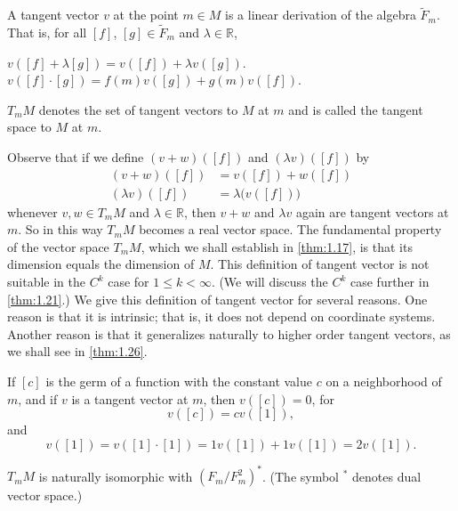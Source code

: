 \begin{definition}\label{thm:1.14}
	A tangent vector  $ v $ at the point  $ m \in M $ is a linear derivation
	of the algebra  $ \widetilde{F}_m $. That is, for all  $ [f] $,
	$ [g] \in \widetilde{F}_m $ and  $ \lambda \in \mathbb{R} $, 
	\begin{enumerate}
		$v([f]+\lambda[g])=v([f])+\lambda v([g]).$
		 $v([f]\cdot[g])=f(m)v([g])+g(m)v([f]).$
	\end{enumerate}

	$ T_{m} M $ denotes the set of tangent vectors to  $ M $ at  $ m $ and
	is called the tangent space to  $ M $ at  $ m $.
\end{definition}
Observe that if we define  $ (v + w)([f]) $ and  $ (\lambda v)([f]) $ by 
\begin{equation}
	\tag{1}\label{eq:1.14:1}
	\begin{aligned}(v+w)([f])&=v([f])+w([f])\\ (\lambda v)([f])&=\lambda\big(v([f])\big)\end{aligned}
\end{equation}
whenever $v, w \in T_{m} M$ and $\lambda \in \mathbb{R}$, then $v + w$ and $\lambda v$ again are tangent
vectors at $m$. So in this way $T_{m} M$ becomes a real vector space.
The fundamental property of the vector space $T_{m} M$,
which we shall establish in \ref{thm:1.17}, is that its dimension
equals the dimension of $M$. This definition of tangent vector
is not suitable in the $C^{k}$ case for $1 \leq k < \infty$.
(We will discuss the $C^{k}$ case further in \ref{thm:1.21}.)
We give this definition of tangent vector for several reasons.
One reason is that it is intrinsic; that is, it does not depend on
coordinate systems. Another reason is that it generalizes naturally
to higher order tangent vectors, as we shall see in \ref{thm:1.26}.

\label{thm:1.15}
If $[c]$ is the germ of a function with the constant value $c$ on a
neighborhood of $m$, and if $v$ is a tangent vector at $m$, then $v([c]) = 0$, for
\[
	v([c])=c v([1]),
\]
and 
\[
	v([1])=v([1]\cdot[1])=1v([1])+1v([1])=2v([1]).
\]
\begin{lemma}\label{thm:1.16}
	$T_{m} M$ is naturally isomorphic with $(F_{m}/F_{m}^{2})^{*}$. (The symbol ${}^{*}$ denotes dual vector space.)
\end{lemma}

